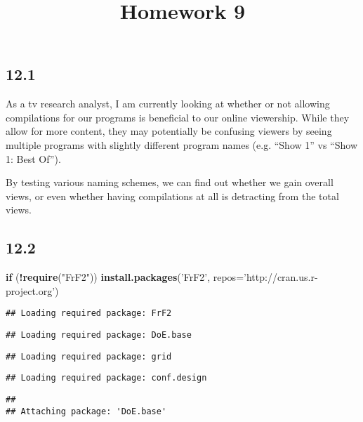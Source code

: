\documentclass[]{article}
\title{Homework 9}
\author{}
\date{}
\newenvironment{Shaded}{\begin{snugshade}}{\end{snugshade}}
\newcommand{\KeywordTok}[1]{\textcolor[rgb]{0.13,0.29,0.53}{\textbf{#1}}}
\newcommand{\DataTypeTok}[1]{\textcolor[rgb]{0.13,0.29,0.53}{#1}}
\newcommand{\StringTok}[1]{\textcolor[rgb]{0.31,0.60,0.02}{#1}}
\newcommand{\ControlFlowTok}[1]{\textcolor[rgb]{0.13,0.29,0.53}{\textbf{#1}}}
\newcommand{\OperatorTok}[1]{\textcolor[rgb]{0.81,0.36,0.00}{\textbf{#1}}}
\newcommand{\NormalTok}[1]{#1}
\begin{document}
\maketitle

\subsection{12.1}\label{section}

As a tv research analyst, I am currently looking at whether or not
allowing compilations for our programs is beneficial to our online
viewership. While they allow for more content, they may potentially be
confusing viewers by seeing multiple programs with slightly different
program names (e.g. ``Show 1'' vs ``Show 1: Best Of'').

By testing various naming schemes, we can find out whether we gain
overall views, or even whether having compilations at all is detracting
from the total views.

\subsection{12.2}\label{section-1}

\begin{Shaded}
\begin{Highlighting}[]
\ControlFlowTok{if}\NormalTok{ (}\OperatorTok{!}\KeywordTok{require}\NormalTok{(}\StringTok{"FrF2"}\NormalTok{))}
\KeywordTok{install.packages}\NormalTok{(}\StringTok{'FrF2'}\NormalTok{, }\DataTypeTok{repos=}\StringTok{'http://cran.us.r-project.org'}\NormalTok{)}
\end{Highlighting}
\end{Shaded}

\begin{verbatim}
## Loading required package: FrF2
\end{verbatim}

\begin{verbatim}
## Loading required package: DoE.base
\end{verbatim}

\begin{verbatim}
## Loading required package: grid
\end{verbatim}

\begin{verbatim}
## Loading required package: conf.design
\end{verbatim}

\begin{verbatim}
## 
## Attaching package: 'DoE.base'
\end{verbatim}
\end{document}
